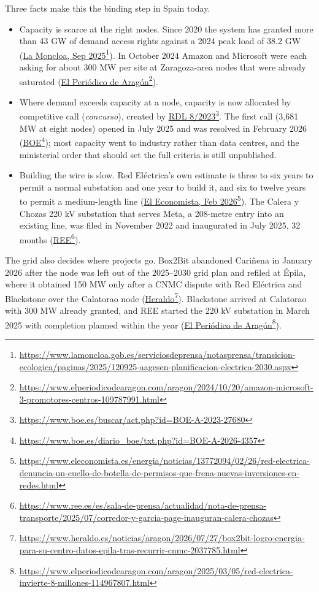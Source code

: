 \documentclass[11pt]{article}
\newcommand{\src}[2]{\href{#1}{#2}\footnote{\url{#1}}}
\begin{document}
Three facts make this the binding step in Spain today.

\begin{itemize}[leftmargin=*]
\item Capacity is scarce at the right nodes. Since 2020 the system has granted more than 43 GW of demand access rights against a 2024 peak load of 38.2 GW (\src{https://www.lamoncloa.gob.es/serviciosdeprensa/notasprensa/transicion-ecologica/paginas/2025/120925-aagesen-planificacion-electrica-2030.aspx}{La Moncloa, Sep 2025}). In October 2024 Amazon and Microsoft were each asking for about 300 MW per site at Zaragoza-area nodes that were already saturated (\src{https://www.elperiodicodearagon.com/aragon/2024/10/20/amazon-microsoft-3-promotores-centros-109787991.html}{El Periódico de Aragón}).
\item Where demand exceeds capacity at a node, capacity is now allocated by competitive call (\emph{concurso}), created by \src{https://www.boe.es/buscar/act.php?id=BOE-A-2023-27680}{RDL 8/2023}. The first call (3,681 MW at eight nodes) opened in July 2025 and was resolved in February 2026 (\src{https://www.boe.es/diario_boe/txt.php?id=BOE-A-2026-4357}{BOE}); most capacity went to industry rather than data centres, and the ministerial order that should set the full criteria is still unpublished.
\item Building the wire is slow. Red Eléctrica's own estimate is three to six years to permit a normal substation and one year to build it, and six to twelve years to permit a medium-length line (\src{https://www.eleconomista.es/energia/noticias/13772094/02/26/red-electrica-denuncia-un-cuello-de-botella-de-permisos-que-frena-nuevas-inversiones-en-redes.html}{El Economista, Feb 2026}). The Calera y Chozas 220 kV substation that serves Meta, a 208-metre entry into an existing line, was filed in November 2022 and inaugurated in July 2025, 32 months (\src{https://www.ree.es/es/sala-de-prensa/actualidad/nota-de-prensa-transporte/2025/07/corredor-y-garcia-page-inauguran-calera-chozas}{REE}).
\end{itemize}

The grid also decides where projects go. Box2Bit abandoned Cariñena in January 2026 after the node was left out of the 2025--2030 grid plan and refiled at Épila, where it obtained 150 MW only after a CNMC dispute with Red Eléctrica and Blackstone over the Calatorao node (\src{https://www.heraldo.es/noticias/aragon/2026/07/27/box2bit-logro-energia-para-su-centro-datos-epila-tras-recurrir-cnmc-2037785.html}{Heraldo}). Blackstone arrived at Calatorao with 300 MW already granted, and REE started the 220 kV substation in March 2025 with completion planned within the year (\src{https://www.elperiodicodearagon.com/aragon/2025/03/05/red-electrica-invierte-8-millones-114967807.html}{El Periódico de Aragón}).
\end{document}
